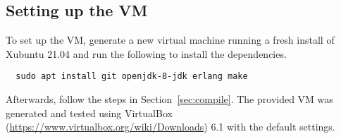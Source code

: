\documentclass[runningheads]{llncs}
\begin{document}
\subsection{Setting up the VM}
To set up the VM, generate a new virtual machine running a fresh install of Xubuntu 21.04 and run the following to install the dependencies.
\begin{verbatim}
  sudo apt install git openjdk-8-jdk erlang make
\end{verbatim}
Afterwards, follow the steps in Section~\ref{sec:compile}.
The provided VM was generated and tested using VirtualBox (\url{https://www.virtualbox.org/wiki/Downloads}) 6.1 with the default settings.




\end{document}
